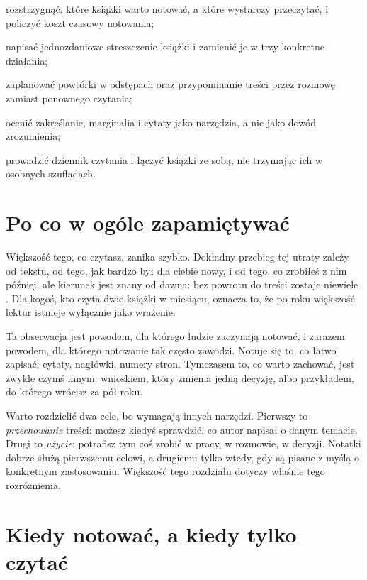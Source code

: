 
\begin{cele}
\item rozstrzygnąć, które książki warto notować, a które wystarczy przeczytać, i policzyć koszt czasowy notowania;
\item napisać jednozdaniowe streszczenie książki i zamienić je w trzy konkretne działania;
\item zaplanować powtórki w odstępach oraz przypominanie treści przez rozmowę zamiast ponownego czytania;
\item ocenić zakreślanie, marginalia i cytaty jako narzędzia, a nie jako dowód zrozumienia;
\item prowadzić dziennik czytania i łączyć książki ze sobą, nie trzymając ich w osobnych szufladach.
\end{cele}

\section{Po co w ogóle zapamiętywać}

Większość tego, co czytasz, zanika szybko. Dokładny przebieg tej utraty zależy od tekstu, od tego, jak bardzo był dla ciebie nowy, i od tego, co zrobiłeś z nim później, ale kierunek jest znany od dawna: bez powrotu do treści zostaje niewiele . Dla kogoś, kto czyta dwie książki w miesiącu, oznacza to, że po roku większość lektur istnieje wyłącznie jako wrażenie.

Ta obserwacja jest powodem, dla którego ludzie zaczynają notować, i zarazem powodem, dla którego notowanie tak często zawodzi. Notuje się to, co łatwo zapisać: cytaty, nagłówki, numery stron. Tymczasem to, co warto zachować, jest zwykle czymś innym: wnioskiem, który zmienia jedną decyzję, albo przykładem, do którego wrócisz za pół roku.

Warto rozdzielić dwa cele, bo wymagają innych narzędzi. Pierwszy to \emph{przechowanie} treści: możesz kiedyś sprawdzić, co autor napisał o danym temacie. Drugi to \emph{użycie}: potrafisz tym coś zrobić w pracy, w rozmowie, w decyzji. Notatki dobrze służą pierwszemu celowi, a drugiemu tylko wtedy, gdy są pisane z myślą o konkretnym zastosowaniu. Większość tego rozdziału dotyczy właśnie tego rozróżnienia.

\section{Kiedy notować, a kiedy tylko czytać}

